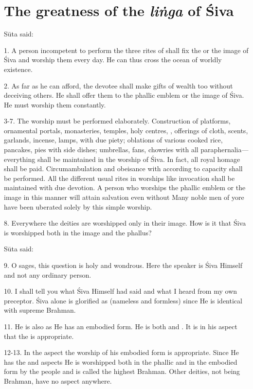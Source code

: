 \chapter{The greatness of the \emph{liṅga} of Śiva}

Sūta said:

1. A person incompetent to perform the three rites of  \etc shall
fix the  or the image of Śiva and worship them every day. He can thus
cross the ocean of worldly existence.

2. As far as he can afford, the devotee shall make gifts of wealth too without
deceiving others. He shall offer them to the phallic emblem or the image of Śiva.
He must worship them constantly.

3-7. The worship must be performed elaborately. Construction of platforms,
ornamental portals, monasteries, temples, holy centres, \etc, offerings of cloth,
scents, garlands, incense, lamps, with due piety; oblations of various cooked
rice, pancakes, pies \etc with side dishes; umbrellas, fans, chowries with all
paraphernalia—everything shall be maintained in the worship of Śiva. In fact,
all royal homage shall be paid. Circumambulation and obeisance with 
according to capacity shall be performed. All the different usual rites in
worships like invocation shall be maintained with due devotion. A person who
worships the phallic emblem or the image in this manner will attain salvation
even without  \etc Many noble men of yore have been uberated solely
by this simple worship.

8. Everywhere the deities are worshipped only in their image. How is it that
Śiva is worshipped both in the image and the phallus?

Sūta said:

9. O sages, this question is holy and wondrous. Here the speaker is Śiva Himself
and not any ordinary person.

10. I shall tell you what Śiva Himself had said and what I heard from my own
preceptor. Śiva alone is glorified as  (nameless and formless) since
He is identical with supreme Brahman.

11. He is also  as He has an embodied form. He is both 
and . It is in his  aspect that the 
is appropriate.

12-13. In the  aspect the worship of his embodied form is appropriate.
Since He has the  and  aspects He is worshipped both in
the phallic and in the embodied form by the people and is called the highest
Brahman. Other deities, not being Brahman, have no  aspect anywhere.

